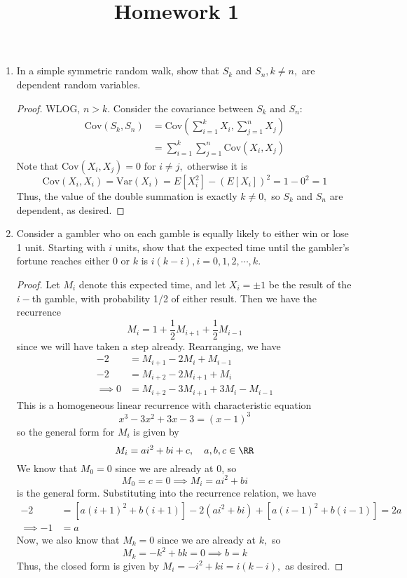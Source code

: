 \documentclass{article}
\newcommand{\var}{\mathrm{Var}}
\newcommand{\cov}{\mathrm{Cov}}
\begin{document}
\title{Homework 1}
\maketitle
\thispagestyle{fancy}

\begin{enumerate}
	\item In a simple symmetric random walk, show that $S_k$ and $S_n, k\neq n,$ are dependent random variables.
		\begin{proof}
			WLOG, $n>k.$ Consider the covariance between $S_k$ and $S_n:$
			\begin{align*}
				\cov(S_k, S_n) &= \cov\left( \sum_{i=1}^{k}X_i, \sum_{j=1}^{n} X_j \right) \\
				&= \sum_{i=1}^{k} \sum_{j=1}^{n} \cov(X_i, X_j)
			\end{align*}
			Note that $\cov(X_i, X_j)=0$ for $i\neq j,$ otherwise it is
			\[\cov(X_i, X_i)=\var(X_i)=E[X_i^2]-(E[X_i])^2 = 1 - 0^2 = 1\]
			Thus, the value of the double summation is exactly $k\neq 0,$ so $S_k$ and $S_n$ are dependent, as desired.
		\end{proof}

	\item Consider a gambler who on each gamble is equally likely to either win or lose 1 unit. Starting with $i$ units, show that the expected time until the gambler's fortune reaches either $0$ or $k$ is $i(k-i), i=0, 1, 2, \cdots, k.$
		\begin{proof}
			Let $M_i$ denote this expected time, and let $X_i=\pm 1$ be the result of the $i-$th gamble, with probability 1/2 of either result. Then we have the recurrence
			\[M_i=1+\frac{1}{2}M_{i+1}+\frac{1}{2}M_{i-1}\]
			since we will have taken a step already. Rearranging, we have
			\begin{align*}
				-2 &= M_{i+1}-2M_i+M_{i-1} \\
				-2 &= M_{i+2}-2M_{i+1}+M_i \\
				\implies 0 &= M_{i+2}-3M_{i+1}+3M_i-M_{i-1}
			\end{align*}
			This is a homogeneous linear recurrence with characteristic equation
			\[x^3-3x^2+3x-3 = (x-1)^3\]
			so the general form for $M_i$ is given by
			\[M_i= ai^2+bi+c, \quad a, b, c\in \RR\]
			We know that $M_0=0$ since we are already at 0, so
			\[M_0=c=0\implies M_i=ai^2+bi\]
			is the general form. Substituting into the recurrence relation, we have
			\begin{align*}
				-2 &= \left[ a(i+1)^2+b(i+1) \right] - 2\left( ai^2+bi \right) + \left[ a(i-1)^2+b(i-1) \right] = 2a \\
				\implies -1 &= a
			\end{align*}
			Now, we also know that $M_k=0$ since we are already at $k,$ so
			\[M_k=-k^2+bk=0\implies b=k\]
			Thus, the closed form is given by $M_i=-i^2+ki=i(k-i),$ as desired.
		\end{proof}


\end{enumerate}
\end{document}
